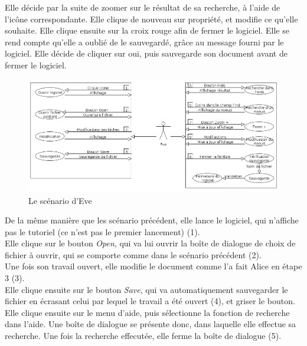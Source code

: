 \documentclass[12pt, a4paper]{article}
\begin{document}
Elle décide par la suite de zoomer sur le résultat de sa recherche, à l'aide de l'icône correspondante. Elle clique de nouveau sur propriété, et modifie ce qu'elle souhaite. Elle clique ensuite sur la croix rouge afin de fermer le logiciel. Elle se rend compte qu'elle a oublié de le sauvegardé, grâce au message fourni par le logiciel. Elle décide de cliquer sur oui, puis sauvegarde son document avant de fermer le logiciel.

\begin{figure}[h]
\begin{center}
   \includegraphics[scale = 0.4]{scenario-eve.png}
	\caption{Le scénario d'Eve}
	\end{center}
\end{figure}


De la même manière que les scénario précédent, elle lance le logiciel, qui n'affiche pas le tutoriel (ce n'est pas le premier lancement) (1). \\


Elle clique sur le bouton \emph{Open}, qui va lui ouvrir la boîte de dialogue de choix de fichier à ouvrir, qui se comporte comme dans le scénario précédent (2).\\


Une fois son travail ouvert, elle modifie le document comme l'a fait Alice en étape 3 (3).\\


Elle clique ensuite sur le bouton \emph{Save}, qui va automatiquement sauvegarder le fichier en écrasant celui par lequel le travail a été ouvert (4), et griser le bouton. \\


Elle clique ensuite sur le menu d'aide, puis sélectionne la fonction de recherche dans l'aide. Une boîte de dialogue se présente donc, dans laquelle elle effectue sa recherche. Une fois la recherche effecutée, elle ferme la boîte de dialogue (5).\\ 
\end{document}
